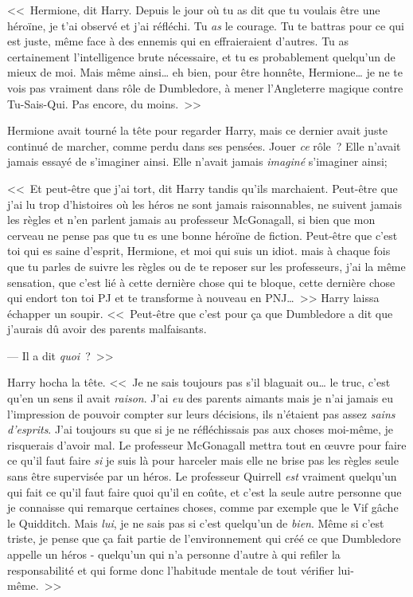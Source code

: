 <<~Hermione, dit Harry. Depuis le jour où tu as dit que tu voulais être une héroïne, je t'ai observé et j'ai réfléchi. Tu \emph{as} le courage. Tu te battras pour ce qui est juste, même face à des ennemis qui en effraieraient d'autres. Tu as certainement l'intelligence brute nécessaire, et tu es probablement quelqu'un de mieux de moi. Mais même ainsi… eh bien, pour être honnête, Hermione… je ne te vois pas vraiment dans rôle de Dumbledore, à mener l'Angleterre magique contre Tu-Sais-Qui. Pas encore, du moins.~>>

Hermione avait tourné la tête pour regarder Harry, mais ce dernier avait juste continué de marcher, comme perdu dans ses pensées. Jouer \emph{ce} rôle~? Elle n'avait jamais essayé de s'imaginer ainsi. Elle n'avait jamais \emph{imaginé} s'imaginer ainsi;

<<~Et peut-être que j'ai tort, dit Harry tandis qu'ils marchaient. Peut-être que j'ai lu trop d'histoires où les héros ne sont jamais raisonnables, ne suivent jamais les règles et n'en parlent jamais au professeur McGonagall, si bien que mon cerveau ne pense pas que tu es une bonne héroïne de fiction. Peut-être que c'est toi qui es saine d'esprit, Hermione, et moi qui suis un idiot. mais à chaque fois que tu parles de suivre les règles ou de te reposer sur les professeurs, j'ai la même sensation, que c'est lié à cette dernière chose qui te bloque, cette dernière chose qui endort ton toi PJ et te transforme à nouveau en PNJ…~>> Harry laissa échapper un soupir. <<~Peut-être que c'est pour ça que Dumbledore a dit que j'aurais dû avoir des parents malfaisants.

--- Il a dit \emph{quoi}~?~>>

Harry hocha la tête. <<~Je ne sais toujours pas s'il blaguait ou… le truc, c'est qu'en un sens il avait \emph{raison}. J'ai \emph{eu} des parents aimants mais je n'ai jamais eu l'impression de pouvoir compter sur leurs décisions, ils n'étaient pas assez \emph{sains d'esprits}. J'ai toujours su que si je ne réfléchissais pas aux choses moi-même, je risquerais d'avoir mal. Le professeur McGonagall mettra tout en œuvre pour faire ce qu'il faut faire \emph{si} je suis là pour harceler mais elle ne brise pas les règles seule sans être supervisée par un héros. Le professeur Quirrell \emph{est} vraiment quelqu'un qui fait ce qu'il faut faire quoi qu'il en coûte, et c'est la seule autre personne que je connaisse qui remarque certaines choses, comme par exemple que le Vif gâche le Quidditch. Mais \emph{lui}, je ne sais pas si c'est quelqu'un de \emph{bien}. Même si c'est triste, je pense que ça fait partie de l'environnement qui créé ce que Dumbledore appelle un héros - quelqu'un qui n'a personne d'autre à qui refiler la responsabilité et qui forme donc l'habitude mentale de tout vérifier lui-même.~>>

